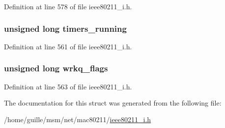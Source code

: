 Definition at line 578 of file ieee80211\-\_\-i.\-h.

\hypertarget{structieee80211__if__mesh_a17be34de946a3782a1daf2f20c1e913d}{
\subsubsection[{timers\-\_\-running}]{\setlength{\rightskip}{0pt plus 5cm}unsigned long timers\-\_\-running}}\label{structieee80211__if__mesh_a17be34de946a3782a1daf2f20c1e913d}


Definition at line 561 of file ieee80211\-\_\-i.\-h.

\hypertarget{structieee80211__if__mesh_a108e8fea002f332c33b05d8ab571f494}{
\subsubsection[{wrkq\-\_\-flags}]{\setlength{\rightskip}{0pt plus 5cm}unsigned long wrkq\-\_\-flags}}\label{structieee80211__if__mesh_a108e8fea002f332c33b05d8ab571f494}


Definition at line 563 of file ieee80211\-\_\-i.\-h.



The documentation for this struct was generated from the following file\-:\begin{DoxyCompactItemize}
\item 
/home/guille/msm/net/mac80211/\hyperlink{ieee80211__i_8h}{ieee80211\-\_\-i.\-h}\end{DoxyCompactItemize}
